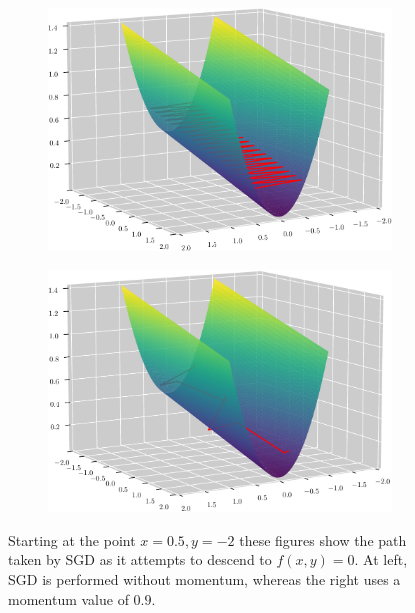 \begin{figure}[ht!]
	\centering
	\begin{subfigure}{.45\textwidth}
		\centering
		\includegraphics[width=\textwidth]{momentum/none-crop}
	\end{subfigure}
	\begin{subfigure}{.45\textwidth}
		\centering
		\includegraphics[width=\textwidth]{momentum/p9crop}
	\end{subfigure}
	\caption[Comparison of SGD with and without momentum]{Starting at the point $x=0.5, y=-2$ these figures show the path taken by SGD as it attempts to descend to $f(x,y)=0$.
	At left, SGD is performed without momentum, whereas the right uses a momentum value of $0.9$.}
	\label{fig:momentum}
\end{figure}

